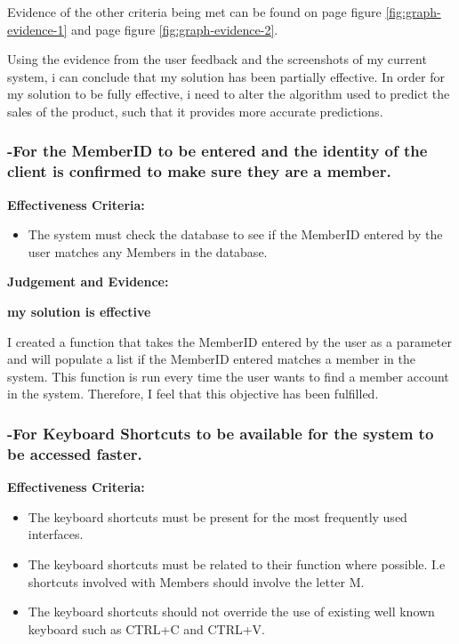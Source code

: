 Evidence of the other criteria being met can be found on page \pageref{fig:graph-evidence-1} figure \ref{fig:graph-evidence-1} and page \pageref{fig:graph-evidence-2} figure \ref{fig:graph-evidence-2}. 

Using the evidence from the user feedback and the screenshots of my current system, i can conclude that my solution has been partially effective. In order for my solution to be fully effective, i need to alter the algorithm used to predict the sales of the product, such that it provides more accurate predictions.












\pagebreak
\subsubsection{-For the MemberID to be entered and the identity of the client is confirmed to make sure they are a member.}

\textbf{Effectiveness Criteria:}\newline
\begin{itemize}
	\item{The system must check the database to see if the MemberID entered by the user matches any Members in the database.}
\end{itemize}

\textbf{Judgement and Evidence:} \newline

\textbf{\large{my solution is effective}}

I created a function that takes the MemberID entered by the user as a parameter and will populate a list if the MemberID entered matches a member in the system. This function is run every time the user wants to find a member account in the system. Therefore, I feel that this objective has been fulfilled.




\pagebreak
\subsubsection{-For Keyboard Shortcuts to be available for the system to be accessed faster.}

\textbf{Effectiveness Criteria:}\newline
\begin{itemize}
	\item{The keyboard shortcuts must be present for the most frequently used interfaces.}
	\item{The keyboard shortcuts must be related to their function where possible. I.e shortcuts involved with Members should involve the letter M.}
	\item{The keyboard shortcuts should not override the use of existing well known keyboard such as CTRL+C and CTRL+V.}
\end{itemize}

